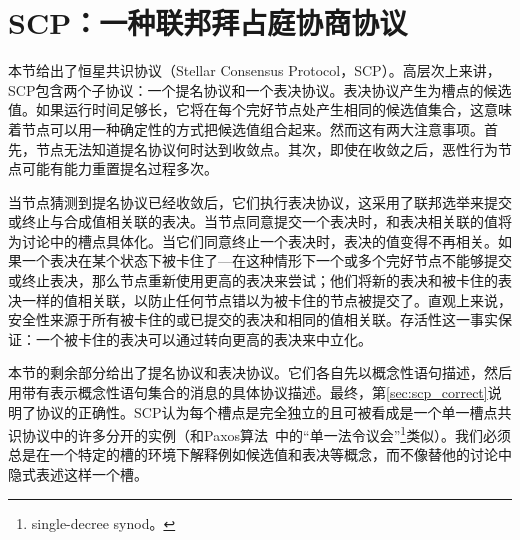 \section{SCP：一种联邦拜占庭协商协议}\label{sec:scp}

本节给出了恒星共识协议（Stellar Consensus Protocol，SCP）。高层次上来讲，SCP包含两个子协议：一个提名协议和一个表决协议。表决协议产生为槽点的候选值。如果运行时间足够长，它将在每个完好节点处产生相同的候选值集合，这意味着节点可以用一种确定性的方式把候选值组合起来。然而这有两大注意事项。首先，节点无法知道提名协议何时达到收敛点。其次，即使在收敛之后，恶性行为节点可能有能力重置提名过程多次。

当节点猜测到提名协议已经收敛后，它们执行表决协议，这采用了联邦选举来提交或终止与合成值相关联的表决。当节点同意提交一个表决时，和表决相关联的值将为讨论中的槽点具体化。当它们同意终止一个表决时，表决的值变得不再相关。如果一个表决在某个状态下被卡住了---在这种情形下一个或多个完好节点不能够提交或终止表决，那么节点重新使用更高的表决来尝试；他们将新的表决和被卡住的表决一样的值相关联，以防止任何节点错以为被卡住的节点被提交了。直观上来说，安全性来源于所有被卡住的或已提交的表决和相同的值相关联。存活性这一事实保证：一个被卡住的表决可以通过转向更高的表决来中立化。

本节的剩余部分给出了提名协议和表决协议。它们各自先以概念性语句描述，然后用带有表示概念性语句集合的消息的具体协议描述。最终，第\ref{sec:scp_correct}说明了协议的正确性。SCP认为每个槽点是完全独立的且可被看成是一个单一槽点共识协议中的许多分开的实例（和Paxos算法~\cite{Lamport:1998:PP:279227.279229}中的``单一法令议会''\footnote{single-decree synod。}类似）。我们必须总是在一个特定的槽的环境下解释例如候选值和表决等概念，而不像替他的讨论中隐式表述这样一个槽。



